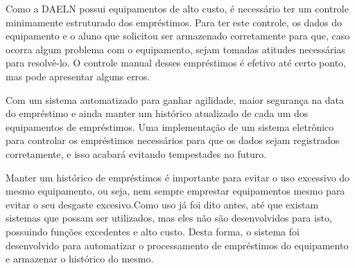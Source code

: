 \vspace{-42pt}
Como a DAELN possui equipamentos de alto custo, é necessário ter um controle minimamente estruturado dos empréstimos. Para ter este controle, os dados do equipamento e o aluno que solicitou ser armazenado corretamente para que, caso ocorra algum problema com o equipamento, sejam tomadas atitudes necessárias para resolvê-lo. O controle manual desses empréstimos é efetivo até certo ponto, mas pode apresentar alguns erros.

Com um sistema automatizado para ganhar agilidade, maior segurança na data do empréstimo e ainda manter um histórico atualizado de cada um dos equipamentos de empréstimos. Uma implementação de um sistema eletrônico para controlar os empréstimos necessários para que os dados sejam registrados corretamente, e isso acabará evitando tempestades no futuro.

Manter um histórico de empréstimos é importante para evitar o uso excessivo do mesmo equipamento, ou seja, nem sempre emprestar equipamentos mesmo para evitar o seu desgaste excesivo.Como uso já foi dito antes, até que existam sistemas que possam ser utilizados, mas eles não são desenvolvidos para isto, possuindo funções excedentes e alto custo. Desta forma, o sistema foi desenvolvido para automatizar o processamento de empréstimos do equipamento e armazenar o histórico do mesmo.